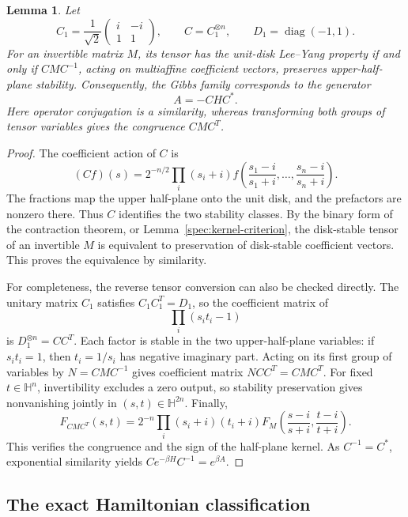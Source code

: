 \documentclass[reqno]{amsart}
\newtheorem{lemma}[theorem]{Lemma}
\theoremstyle{definition}
\theoremstyle{remark}
\newcommand{\HH}{\mathbb H}
\DeclareMathOperator{\diag}{diag}
\begin{document}
\begin{lemma}\label{eq:cayley-bridge}
Let
\[
 C_1=\frac1{\sqrt2}\begin{pmatrix}i&-i\\1&1\end{pmatrix},
 \qquad C=C_1^{\otimes n},\qquad D_1=\diag(-1,1).
\]
For an invertible matrix \(M\), its tensor has the unit-disk
Lee--Yang property if and only if \(CMC^{-1}\), acting on
multiaffine coefficient vectors, preserves upper-half-plane stability.
Consequently, the Gibbs family corresponds to the generator
\begin{equation}\label{eq:generator}
 A=-CHC^*.
\end{equation}
Here operator conjugation is a similarity, whereas transforming both
groups of tensor variables gives the congruence \(CMC^T\).
\end{lemma}
\begin{proof}
The coefficient action of \(C\) is
\[
 (Cf)(s)=2^{-n/2}\prod_i(s_i+i)
 f\!\left(\frac{s_1-i}{s_1+i},\ldots,
           \frac{s_n-i}{s_n+i}\right).
\]
The fractions map the upper half-plane onto the unit disk, and the
prefactors are nonzero there.  Thus \(C\) identifies the two
stability classes.  By the binary form of the contraction theorem,
or Lemma~\ref{spec:kernel-criterion}, the disk-stable tensor of an
invertible \(M\) is equivalent to preservation of disk-stable
coefficient vectors.  This proves the equivalence by similarity.

For completeness, the reverse tensor conversion can also be checked
directly.  The unitary matrix \(C_1\) satisfies \(C_1C_1^T=D_1\),
so the coefficient matrix of
\[
 \prod_i(s_it_i-1)
\]
is \(D_1^{\otimes n}=CC^T\).  Each factor is stable in the two
upper-half-plane variables: if \(s_it_i=1\), then
\(t_i=1/s_i\) has negative imaginary part.  Acting on its first
group of variables by \(N=CMC^{-1}\) gives coefficient matrix
\(NCC^T=CMC^T\).  For fixed \(t\in\HH^n\), invertibility
excludes a zero output, so stability preservation gives nonvanishing
jointly in \((s,t)\in\HH^{2n}\).  Finally,
\[
 F_{CMC^T}(s,t)
 =2^{-n}\prod_i(s_i+i)(t_i+i)
 F_M\!\left(\frac{s-i}{s+i},\frac{t-i}{t+i}\right).
\]
This verifies the congruence and the sign of the half-plane kernel.
As \(C^{-1}=C^*\), exponential similarity yields
\(Ce^{-\beta H}C^{-1}=e^{\beta A}\).
\end{proof}

\subsection{The exact Hamiltonian classification}
\end{document}
